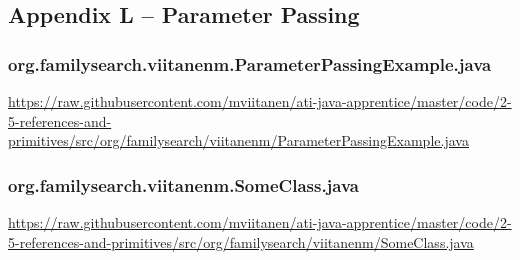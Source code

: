 \subsection*{Appendix L -- Parameter Passing} \label{App:AppendixL}

\subsubsection*{org.familysearch.viitanenm.ParameterPassingExample.java}
\noindent
\begin{minipage}{.6in}
\end{minipage}
\begin{minipage}{6in}
  \url{https://raw.githubusercontent.com/mviitanen/ati-java-apprentice/master/code/2-5-references-and-primitives/src/org/familysearch/viitanenm/ParameterPassingExample.java}
\end{minipage}

\vspace{1em}
\subsubsection*{org.familysearch.viitanenm.SomeClass.java}
\noindent
\begin{minipage}{.6in}
\end{minipage}
\begin{minipage}{6in}
  \url{https://raw.githubusercontent.com/mviitanen/ati-java-apprentice/master/code/2-5-references-and-primitives/src/org/familysearch/viitanenm/SomeClass.java}
\end{minipage}